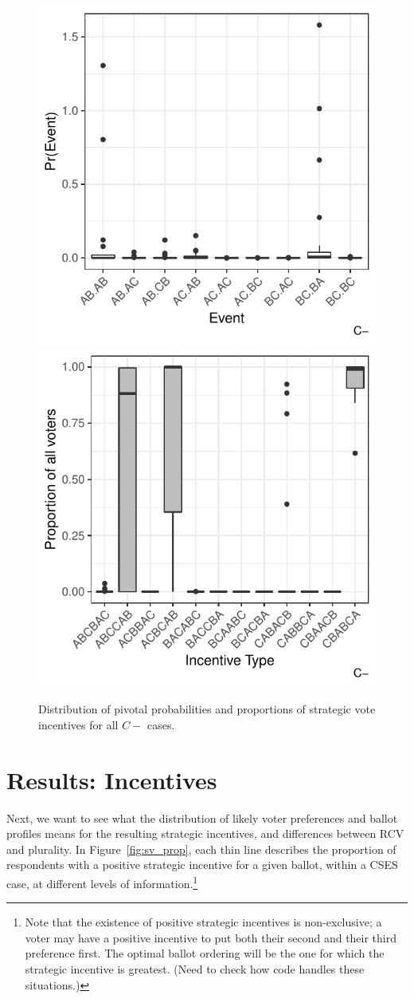 \documentclass[11pt, letter]{article}
\begin{document}
\begin{figure}[!htb]
	\centering
	\includegraphics[width = .45\textwidth]{../output/figures/prediction/pprob_dm_c.pdf}
	\includegraphics[width = .45\textwidth]{../output/figures/prediction/svinc_dm_c.pdf}
	\caption{Distribution of pivotal probabilities and proportions of strategic vote incentives for all $C-$ cases.}
	\label{fig:figure1}
\end{figure}


\section{Results: Incentives}

Next, we want to see what the distribution of likely voter preferences and ballot profiles means for the resulting strategic incentives, and differences between RCV and plurality. In Figure~\ref{fig:sv_prop}, each thin line describes the proportion of respondents with a positive strategic incentive for a given ballot, within a CSES case, at different levels of information.\footnote{Note that the existence of positive strategic incentives is non-exclusive; a voter may have a positive incentive to put both their second and their third preference first. The optimal ballot ordering will be the one for which the strategic incentive is greatest. (Need to check how code handles these situations.)}
\end{document}
